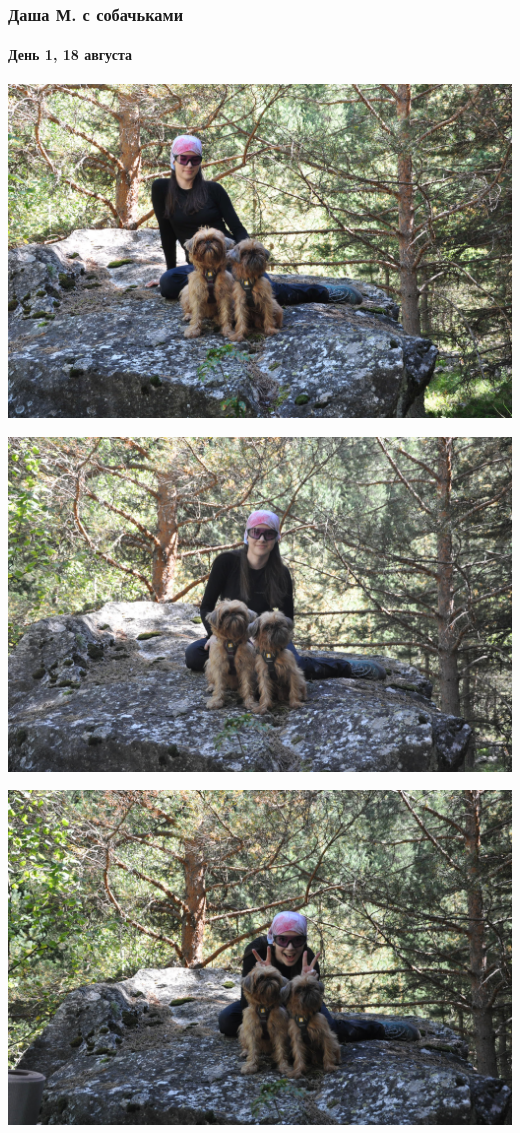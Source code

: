 \begin{frame}
	\frametitle{Даша М. с собачьками}
	\framesubtitle{День 1, 18 августа}
	{\tiny
		\begin{minipage}{\fourpicsize}
			\centering
			\includegraphics[width=\textwidth]{../pics/DSC_0472}			

		\end{minipage}
		\hfill
		\begin{minipage}{\fourpicsize}
			\centering
			\includegraphics[width=\textwidth]{../pics/DSC_0474}			

		\end{minipage}
		\vfill
		\centering
		\begin{minipage}{\fourpicsize}
			\centering
			\includegraphics[width=\textwidth]{../pics/DSC_0475}			


\end{minipage}}
\end{frame}
